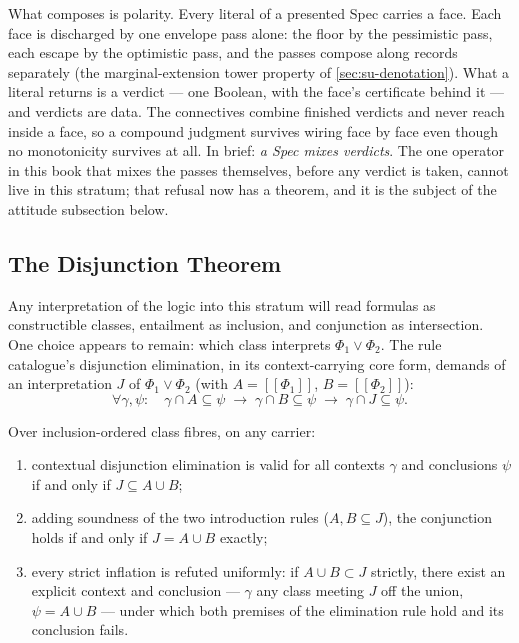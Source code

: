 What composes is polarity. Every literal of a presented Spec
carries a face. Each face is discharged by one envelope pass
alone: the floor by the pessimistic pass, each escape by the
optimistic pass, and the passes compose along records separately
(the marginal-extension tower property of
\autoref{sec:su-denotation}). What a literal returns is a verdict
--- one Boolean, with the face's certificate behind it --- and
verdicts are data. The connectives combine finished verdicts and
never reach inside a face, so a compound judgment survives wiring
face by face even though no monotonicity survives at all. In
brief: \emph{a Spec mixes verdicts}. The one operator in this book
that mixes the passes themselves, before any verdict is taken,
cannot live in this stratum; that refusal now has a theorem, and
it is the subject of the attitude subsection below.

\subsection{The Disjunction Theorem}

Any interpretation of the logic into this stratum will read
formulas as constructible classes, entailment as inclusion, and
conjunction as intersection. One choice appears to remain: which
class interprets $\Phi_1 \vee \Phi_2$. The rule catalogue's
disjunction elimination, in its context-carrying core form,
demands of an interpretation $J$ of $\Phi_1 \vee \Phi_2$ (with
$A = [\![\Phi_1]\!]$, $B = [\![\Phi_2]\!]$):
\[
  \forall \gamma, \psi \colon\quad
  \gamma \cap A \subseteq \psi
  \;\longrightarrow\;
  \gamma \cap B \subseteq \psi
  \;\longrightarrow\;
  \gamma \cap J \subseteq \psi .
\]

\begin{theorem}
\label{thm:su-vee-forcing}
Over inclusion-ordered class fibres, on any carrier:
\begin{enumerate}
\item contextual disjunction elimination is valid for all contexts
  $\gamma$ and conclusions $\psi$ if and only if
  $J \subseteq A \cup B$;
\item adding soundness of the two introduction rules
  ($A, B \subseteq J$), the conjunction holds if and only if
  $J = A \cup B$ exactly;
\item every strict inflation is refuted uniformly: if
  $A \cup B \subset J$ strictly, there exist an explicit context and
  conclusion --- $\gamma$ any class meeting $J$ off the union,
  $\psi = A \cup B$ --- under which both premises of the elimination
  rule hold and its conclusion fails.
\end{enumerate}
\end{theorem}

